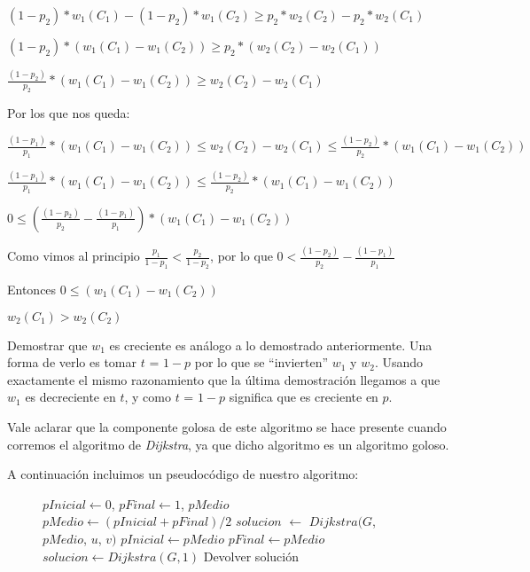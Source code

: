 $(1-p_2)*w_1(C_1) - (1-p_2)*w_1(C_2) \geq  p_2*w_2(C_2) - p_2*w_2(C_1) $

$(1-p_2)*(w_1(C_1) - w_1(C_2)) \geq  p_2*(w_2(C_2) - w_2(C_1)) $

$\frac{(1-p_2)}{p_2}*(w_1(C_1) - w_1(C_2)) \geq  w_2(C_2) - w_2(C_1) $

Por los que nos queda:

$\frac{(1-p_1)}{p_1}*(w_1(C_1) - w_1(C_2)) \leq  w_2(C_2) - w_2(C_1) \leq \frac{(1-p_2)}{p_2}*(w_1(C_1) - w_1(C_2))$

$\frac{(1-p_1)}{p_1}*(w_1(C_1) - w_1(C_2)) \leq \frac{(1-p_2)}{p_2}*(w_1(C_1) - w_1(C_2))$

$ 0 \leq (\frac{(1-p_2)}{p_2} - \frac{(1-p_1)}{p_1})*(w_1(C_1) - w_1(C_2))$

Como vimos al principio $\frac{p_1}{1-p_1} < \frac{p_2}{1-p_2}$, por lo que $0 < \frac{(1-p_2)}{p_2} - \frac{(1-p_1)}{p_1} $

Entonces $ 0 \leq (w_1(C_1) - w_1(C_2))$

$w_2(C_1) > w_2(C_2)$

Demostrar que $w_1$ es creciente es análogo a lo demostrado anteriormente. Una forma de verlo es tomar $t$ = $1-p$ por lo que se ``invierten'' $w_1$ y $w_2$. Usando exactamente el mismo razonamiento que la última demostración llegamos a que $w_1$ es decreciente en $t$, y como $t$ = $1-p$ significa que es creciente en $p$.

Vale aclarar que la componente golosa de este algoritmo se hace presente cuando corremos el algoritmo de \emph{Dijkstra}, ya que dicho algoritmo es un algoritmo goloso.

A continuación incluimos un pseudocódigo de nuestro algoritmo:

\begin{center}
 \begin{figure}[H]
  \begin{pseudo}
    \State $pInicial \leftarrow 0$, $pFinal \leftarrow 1$, $pMedio$
      \State $pMedio \leftarrow (pInicial + pFinal)/2$
      \State $solucion$ $\leftarrow$ $Dijkstra(G$, $pMedio$, $u$, $v)$
	 \State $pInicial \leftarrow pMedio$
      \Else
	 \State $pFinal \leftarrow pMedio$
      \EndIf
    \EndFor
      \State $solucion \leftarrow Dijkstra(G, 1)$
    \EndIf
    \State Devolver solución
   \EndProcedure
  \end{pseudo}
 \end{figure}
\end{center}